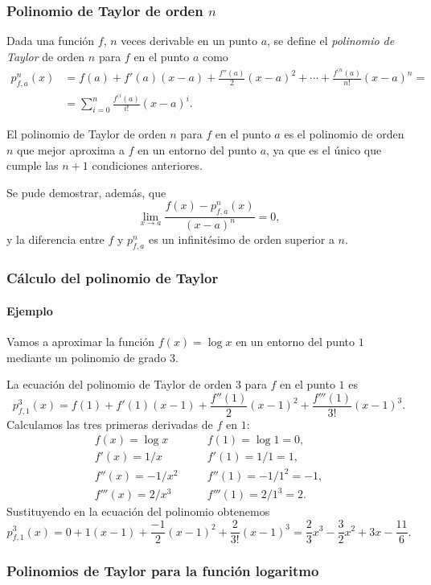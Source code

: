 \begin{frame}
\frametitle{Polinomio de Taylor de orden $n$}
\begin{definicion}
Dada una función $f$, $n$ veces derivable en un punto $a$, se define el \emph{polinomio de Taylor} de orden $n$ para $f$ en el punto $a$ como
\begin{align*}
p_{f,a}^n(x)&=f(a)+f'(a)(x-a)+\frac{f''(a)}{2}(x-a)^2+\cdots +\frac{f^{(n}(a)}{n!}(x-a)^n = \\ &=\sum_{i=0}^{n}\frac{f^{(i}(a)}{i!}(x-a)^i.
\end{align*}
\end{definicion}

El polinomio de Taylor de orden $n$ para $f$ en el punto $a$ es el polinomio de orden $n$ que mejor aproxima a $f$ en un entorno del punto $a$, ya que es el único que cumple las $n+1$ condiciones anteriores.

Se pude demostrar, además, que
\[
\lim_{x\rightarrow a}\frac{f(x)-p_{f,a}^n(x)}{(x-a)^n}=0,
\]
y la diferencia entre $f$ y $p_{f,a}^n$ es un infinitésimo de orden superior a $n$.
\end{frame}


\begin{frame}
\frametitle{Cálculo del polinomio de Taylor}
\framesubtitle{Ejemplo}
Vamos a aproximar la función $f(x)=\log x$ en un entorno del punto $1$ mediante un polinomio de grado $3$.

La ecuación del polinomio de Taylor de orden $3$ para $f$ en el punto $1$ es
\[
p_{f,1}^3(x)=f(1)+f'(1)(x-1)+\frac{f''(1)}{2}(x-1)^2+\frac{f'''(1)}{3!}(x-1)^3.
\]
Calculamos las tres primeras derivadas de $f$ en $1$:
\[
\begin{array}{lll}
f(x)=\log x & \quad & f(1)=\log 1 =0,\\
f'(x)=1/x & & f'(1)=1/1=1,\\
f''(x)=-1/x^2 & & f''(1)=-1/1^2=-1,\\
f'''(x)=2/x^3 & & f'''(1)=2/1^3=2.
\end{array}
\]
Sustituyendo en la ecuación del polinomio obtenemos
\[
p_{f,1}^3(x)=0+1(x-1)+\frac{-1}{2}(x-1)^2+\frac{2}{3!}(x-1)^3= \frac{2}{3}x^3-\frac{3}{2}x^2+3x-\frac{11}{6}.
\]
\end{frame}


\begin{frame}
\frametitle{Polinomios de Taylor para la función logaritmo}
\begin{center}
\scalebox{1}{}
\end{center}
\end{frame}


